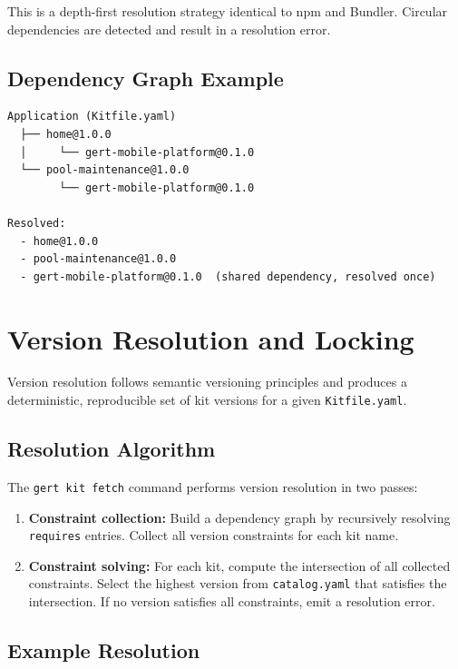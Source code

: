 This is a depth-first resolution strategy identical to npm and Bundler. Circular dependencies are detected and result in a resolution error.

\subsection{Dependency Graph Example}

\begin{verbatim}
Application (Kitfile.yaml)
  ├── home@1.0.0
  │     └── gert-mobile-platform@0.1.0
  └── pool-maintenance@1.0.0
        └── gert-mobile-platform@0.1.0

Resolved:
  - home@1.0.0
  - pool-maintenance@1.0.0
  - gert-mobile-platform@0.1.0  (shared dependency, resolved once)
\end{verbatim}

\section{Version Resolution and Locking}
\label{sec:version-resolution}

Version resolution follows semantic versioning principles and produces a deterministic, reproducible set of kit versions for a given \texttt{Kitfile.yaml}.

\subsection{Resolution Algorithm}

The \texttt{gert kit fetch} command performs version resolution in two passes:

\begin{enumerate}
  \item \textbf{Constraint collection:} Build a dependency graph by recursively resolving \texttt{requires} entries. Collect all version constraints for each kit name.
  
  \item \textbf{Constraint solving:} For each kit, compute the intersection of all collected constraints. Select the highest version from \texttt{catalog.yaml} that satisfies the intersection. If no version satisfies all constraints, emit a resolution error.
\end{enumerate}

\subsection{Example Resolution}

